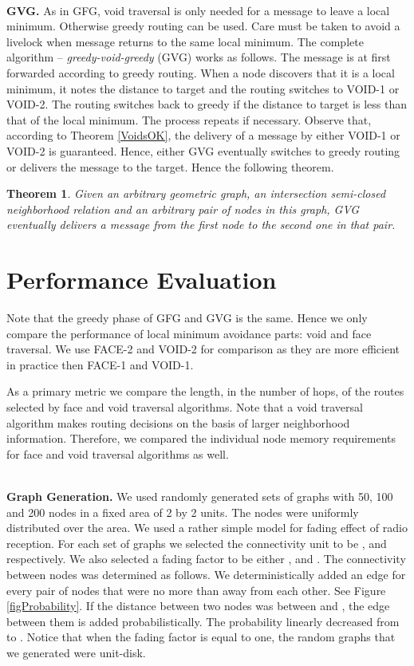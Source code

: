 \documentclass[conference]{IEEEtran}
\newtheorem{theorem}{Theorem}
\begin{document}
\ \\ \textbf{GVG.} As in GFG, void traversal is only needed for a
message to leave a local minimum. Otherwise greedy routing can be
used. Care must be taken to avoid a livelock when message returns to
the same local minimum.  The complete algorithm --
\emph{greedy-void-greedy} (GVG) works as follows. The message is at
first forwarded according to greedy routing. When a node discovers
that it is a local minimum, it notes the distance to target and the
routing switches to VOID-1 or VOID-2.  The routing switches back to
greedy if the distance to target is less than that of the local
minimum.  The process repeats if necessary.  Observe that, according
to Theorem \ref{VoidsOK}, the delivery of a message by either VOID-1
or VOID-2 is guaranteed. Hence, either GVG eventually switches to
greedy routing or delivers the message to the target. Hence the
following theorem.

\begin{theorem}
Given an arbitrary geometric graph, an intersection semi-closed
neighborhood relation and an arbitrary pair of nodes in this graph,
GVG eventually delivers a message from the first node to the second
one in that pair.
\end{theorem}










\section{Performance Evaluation}
\label{SecEval}

Note that the greedy phase of GFG and GVG is the same. Hence we only
compare the performance of local minimum avoidance parts: void and
face traversal. We use FACE-2 and VOID-2 for comparison as they are
more efficient in practice then FACE-1 and VOID-1.

As a primary metric we compare the length, in the number of hops, of
the routes selected by face and void traversal algorithms. Note that a
void traversal algorithm makes routing decisions on the basis of
larger neighborhood information. Therefore, we compared the individual
node memory requirements for face and void traversal algorithms as
well.


\ \\ \textbf{Graph Generation.}  We used randomly generated sets of
graphs with 50, 100 and 200 nodes in a fixed area of 2 by 2 units. The
nodes were uniformly distributed over the area. We used a rather
simple model for fading effect of radio reception.  For each set of
graphs we selected the connectivity unit  to be ,  and
 respectively. We also selected a fading factor  to be either
,  and .  The connectivity between nodes was determined as
follows. We deterministically added an edge for every pair of nodes
that were no more than  away from each other.  See Figure
\ref{figProbability}.  If the distance between two nodes was between
 and , the edge between them is added
probabilistically. The probability linearly decreased from  to
. Notice that when the fading factor  is equal to one, the
random graphs that we generated were unit-disk.
\end{document}
